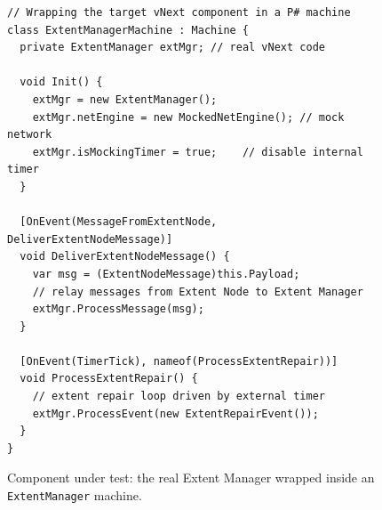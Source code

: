 

\begin{figure}[t]
\begin{lstlisting}
// Wrapping the target vNext component in a P# machine
class ExtentManagerMachine : Machine {
  private ExtentManager extMgr; // real vNext code

  void Init() {
    extMgr = new ExtentManager();
    extMgr.netEngine = new MockedNetEngine(); // mock network
    extMgr.isMockingTimer = true;	 // disable internal timer
  }

  [OnEvent(MessageFromExtentNode, DeliverExtentNodeMessage)]
  void DeliverExtentNodeMessage() {
    var msg = (ExtentNodeMessage)this.Payload;
    // relay messages from Extent Node to Extent Manager
    extMgr.ProcessMessage(msg);
  }
	
  [OnEvent(TimerTick), nameof(ProcessExtentRepair))]
  void ProcessExtentRepair() {
    // extent repair loop driven by external timer
    extMgr.ProcessEvent(new ExtentRepairEvent());
  }
}
\end{lstlisting}
\vspace{-2mm}
\caption{Component under test: the real Extent Manager wrapped inside an \texttt{ExtentManager} \psharp machine.}
\label{fig:wrap_target}
\end{figure}

